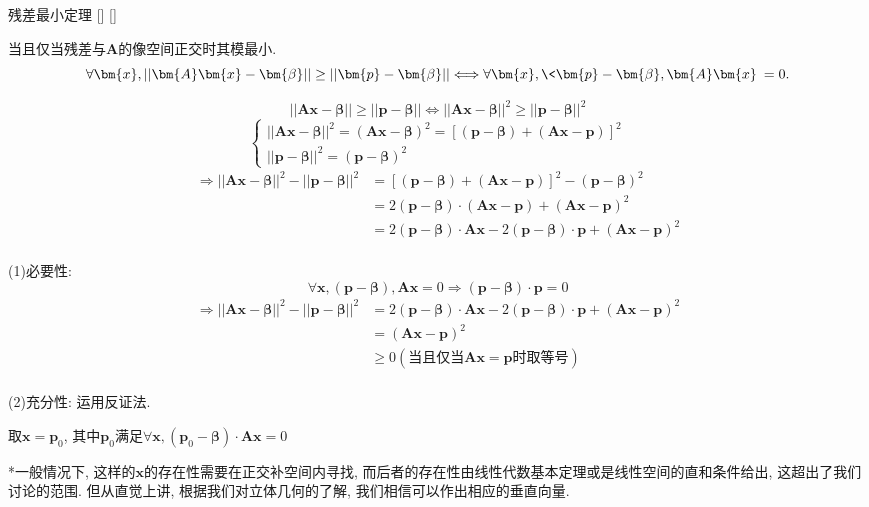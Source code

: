 \documentclass[UTF8]{ctexart}
\begin{document}
		\begin{thm}
			[]
			{残差最小定理}
			[]
			[]

			当且仅当残差与$\bm{A}$的像空间正交时其模最小. 
			\[\forall\bm{x}, ||\bm{A}\bm{x}-\bm{\beta}||\geq||\bm{p}-\bm{\beta}||\Longleftrightarrow \forall\bm{x}, \<\bm{p}-\bm{\beta},\bm{A}\bm{x}\>=0. \]
		\end{thm}
		
		\begin{prf}
			\[||\bm{A}\bm{x}-\bm{\beta}||\geq||\bm{p}-\bm{\beta}||\Longleftrightarrow||\bm{A}\bm{x}-\bm{\beta}||^2\geq||\bm{p}-\bm{\beta}||^2\]
			\[\begin{cases}
			||\bm{A}\bm{x}-\bm{\beta}||^2=(\bm{A}\bm{x}-\bm{\beta})^2=[(\bm{p}-\bm{\beta})+(\bm{A}\bm{x}-\bm{p})]^2\\
			||\bm{p}-\bm{\beta}||^2=(\bm{p}-\bm{\beta})^2
			\end{cases}\]
			\[\begin{aligned}
			\Longrightarrow||\bm{A}\bm{x}-\bm{\beta}||^2-||\bm{p}-\bm{\beta}||^2 & = [(\bm{p}-\bm{\beta})+(\bm{A}\bm{x}-\bm{p})]^2-(\bm{p}-\bm{\beta})^2\\
			& = 2(\bm{p}-\bm{\beta})\cdot(\bm{A}\bm{x}-\bm{p})+(\bm{A}\bm{x}-\bm{p})^2\\
			& = 2(\bm{p}-\bm{\beta})\cdot\bm{A}\bm{x}-2(\bm{p}-\bm{\beta})\cdot\bm{p}+(\bm{A}\bm{x}-\bm{p})^2\\
			\end{aligned}\]
			
			(1)必要性: 
				\[\forall\bm{x}, (\bm{p}-\bm{\beta}),\bm{A}\bm{x}=0\Longrightarrow(\bm{p}-\bm{\beta})\cdot\bm{p}=0\]
				\[\begin{aligned}
				\Longrightarrow||\bm{A}\bm{x}-\bm{\beta}||^2-||\bm{p}-\bm{\beta}||^2 & = 2(\bm{p}-\bm{\beta})\cdot\bm{A}\bm{x}-2(\bm{p}-\bm{\beta})\cdot\bm{p}+(\bm{A}\bm{x}-\bm{p})^2\\
				& = (\bm{A}\bm{x}-\bm{p})^2\\
				& \geq 0(\text{当且仅当$\bm{A}\bm{x}=\bm{p}$时取等号})\\
				\end{aligned}\]
				
			(2)充分性: 运用反证法. 
				
				取$\bm{x}=\bm{p}_0$, 其中$\bm{p}_0$满足$\forall\bm{x}, (\bm{p}_0-\bm{\beta})\cdot\bm{A}\bm{x}=0$
				
				*一般情况下, 这样的$\bm{x}$的存在性需要在正交补空间内寻找, 而后者的存在性由线性代数基本定理或是线性空间的直和条件给出, 这超出了我们讨论的范围. 但从直觉上讲, 根据我们对立体几何的了解, 我们相信可以作出相应的垂直向量. 
				

\end{prf}
\end{document}
